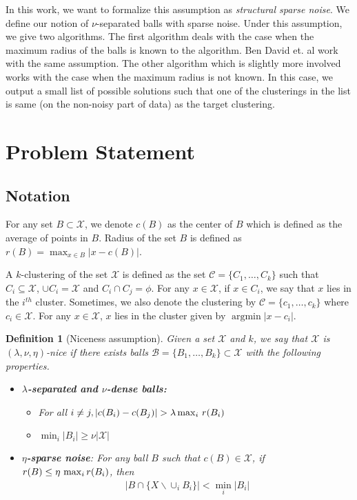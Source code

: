 \documentclass[twoside]{article}
\newcommand{\mc}{\mathcal}
\newtheorem{definition}[theorem]{Definition}
\DeclareMathOperator{\argmin}{argmin}
\begin{document}
In this work, we want to formalize this assumption as \emph{structural sparse noise}. We define our notion of $\nu$-separated balls with sparse noise. Under this assumption, we give two algorithms. The first algorithm deals with the case when the maximum radius of the balls is known to the algorithm. Ben David et. al \cite{ben2014clustering} work with the same assumption. The other algorithm which is slightly more involved works with the case when the maximum radius is not known. In this case, we output a small list of possible solutions such that one of the clusterings in the list is same (on the non-noisy part of data) as the target clustering. 


\section{Problem Statement}

\subsection{Notation}
For any set $B\subset \mc X$, we denote $c(B)$ as the center of $B$ which is defined as the average of points in $B$. Radius of the set $B$ is defined as $r(B)=\max_{x\in B} |x-c(B)|$. 

A $k$-clustering of the set $\mc X$ is defined as the set $\mc C = \{C_1,\ldots,C_k\}$ such that $C_i \subseteq \mc X$, $\cup C_i = \mc X$ and $C_i \cap C_j = \phi$. For any $x \in \mc X$, if $x \in C_i$, we say that $x$ lies in the $i^{th}$ cluster. Sometimes, we also denote the clustering by $\mc C = \{c_1,\ldots,c_k\}$ where $c_i \in \mc X$. For any $x \in \mc X$, $x$ lies in the cluster given by $\argmin |x-c_i|$.

\begin{definition}[Niceness assumption]
Given a set $\mc X$ and $k$, we say that $\mc X$ is $(\lambda,\nu, \eta)$-nice if there exists balls $\mc B=\{B_1,\ldots,B_k\}\subset \mathcal{X}$ with the following properties.
\vspace{-3mm}
\begin{itemize}
\item{\bf{$\lambda$-separated and $\nu$-dense balls}:}
	\begin{itemize}[nolistsep,noitemsep]
	\item[$\diamond$] For all $i\neq j, |c(B_i)-c(B_j)| > \lambda\max_i \thinspace r(B_i)$
	\item[$\diamond$] $\min_i|B_i| \ge \nu |\mc X|$
	\end{itemize}
\item{\bf{$\eta$-sparse noise}}: For any ball $B$ such that $c(B)\in \mathcal{X}$, if $r(B)\leq \eta \thinspace\max_i  r(B_i)$, then 
\begin{align*}
|B\cap \{X \backslash \cup_i B_i\}| < \min_i |B_i|
\end{align*}
\end{itemize}
\label{defn:niceness}
\end{definition}
\end{document}
